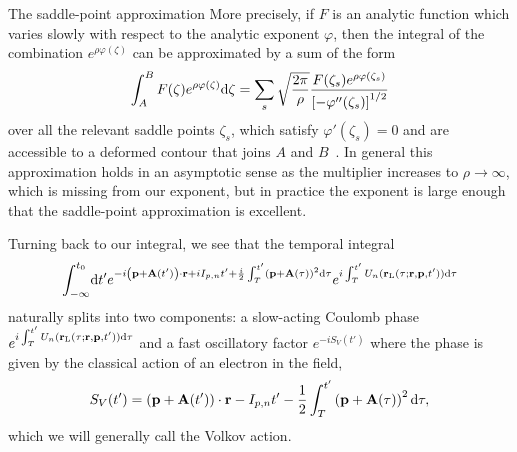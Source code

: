 \pagebreak
\begin{mathaside}{The saddle-point approximation}
\label{aside.SPA}
\noindent
More precisely, if $F$ is an analytic function which varies slowly with respect to the analytic exponent $\varphi$, then the integral of the combination $e^{\rho \varphi(\zeta)}$ can be approximated by a sum of the form
\begin{equation}
\int_A^B F(\zeta) e^{\rho \varphi(\zeta)}\mathrm{d}\zeta
=
\sum_s
\sqrt{\frac{2\pi}{\rho}} 
\frac{F(\zeta_s) e^{\rho\varphi(\zeta_s)}}{\left[-\varphi''(\zeta_s)\right]^{1/2}}
\label{e2-SPA-statement}
\end{equation}
over all the relevant saddle points $\zeta_s$, which satisfy $\varphi'(\zeta_s)=0$ and are accessible to a deformed contour that joins $A$ and $B$~\cite{BruijnAsymptotics, Bleistein_Integrals, GerlachSPAonline}. In general this approximation holds in an asymptotic sense as the multiplier increases to $\rho\to\infty$, which is missing from our exponent, but in practice the exponent is large enough that the saddle-point approximation is excellent.
\end{mathaside}




Turning back to our integral, we see that the temporal integral 
\begin{align}
\int_{-\infty}^{{t_0}}\!\mathrm{d} t'
e^{-i\left(\vb{p}+\vb{A}(t')\right)\cdot\vb{r}
 +i I_{p,n} t'
 +\frac{i}{2} \int_T^{t'}\left(\vb{p}+\vb{A}(\tau)\right)^2\mathrm{d}\tau}
e^{i\int_T^{t'} U_n(\vb{r}_\mathrm{L}(\tau;\vb{r},\vb{p},t'))\mathrm{d}\tau}
\label{e2-temporal-integral-before-saddle-point}
\end{align}
naturally splits into two components: a slow-acting Coulomb phase $e^{i\int_T^{t'} U_n(\vb{r}_\mathrm{L}(\tau;\vb{r},\vb{p},t'))\mathrm{d}\tau}$ and a fast oscillatory factor $e^{-iS_V(t')}$ where the phase is given by the classical action of an electron in the field, 
\begin{equation}
S_V(t')
=
\left(\vb{p}+\vb{A}(t')\right)\cdot\vb{r}
-I_{p,n} t'
-\frac{1}{2} \int_T^{t'}\left(\vb{p}+\vb{A}(\tau)\right)^2\mathrm{d}\tau,
\label{e2-volkov-action-definition}
\end{equation}
which we will generally call the Volkov action.

